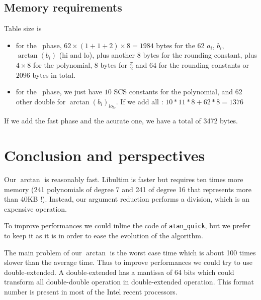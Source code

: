 \subsection{Memory requirements}
Table size is
\begin{itemize}
\item for the \quick\ phase,
  $62\times (1+1+2) \times8=1984$ bytes for the 62 $a_i$, $b_i$,
  $\arctan(b_i)$ (hi and lo), plus another $8$ bytes for the rounding
  constant, plus $4\times8$ for the polynomial, $8$ bytes for
  $\frac{\pi}{2}$ and $64$ for the rounding constants or $2096$ bytes in
  total.
  
\item for the \accurate\ phase, we just have $10$ SCS constants for the
  polynomial, and 62 other double for $\arctan(b_i)_{lo_{lo}}$.
  If we add all : $10*11*8 + 62*8 = 1376$
\end{itemize}
If we add the fast phase and the acurate one, we have a total of 3472
bytes. 


\section{Conclusion and perspectives}

Our $\arctan$ is reasonably fast.  Libultim is faster but requires ten
times more memory (241 polynomials of degree 7 and 241 of degree 16
that represents more than 40KB !). Instead, our argument reduction
performs a division, which is an expensive operation.

To improve performances we could inline the code of \texttt{atan\_quick},
but we prefer to keep it as it is in order to ease the evolution of the
algorithm.

The main problem of our $\arctan$ is the worst case time which is about 100
times slower than the average time. Thus to improve performances we could
try to use double-extended. A double-extended has a mantissa of 64 bits
which could transform all double-double operation in double-extended
operation. This format number is present in most of the Intel recent
processors.
